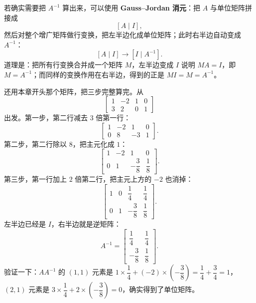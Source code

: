 \documentclass[UTF8,a4paper,12pt]{ctexart}
\numberwithin{equation}{section}
\begin{document}
	若确实需要把 $A^{-1}$ 算出来，可以使用 \textbf{Gauss--Jordan 消元}：把 $A$ 与单位矩阵拼接成
	\begin{equation}\label{eq:4.39}
	[A\mid I],
	\end{equation}
	然后对整个增广矩阵做行变换，把左半边化成单位矩阵；此时右半边自动变成 $A^{-1}$：
	\begin{equation}\label{eq:4.40}
	[A\mid I]
	\longrightarrow
	[I\mid A^{-1}].
	\end{equation}
	道理是：把所有行变换合并成一个矩阵 $M$，左半边变成 $I$ 说明 $MA=I$，即 $M=A^{-1}$；而同样的变换作用在右半边，得到的正是 $MI=M=A^{-1}$。
	
	还用本章开头那个矩阵，把三步完整算完。从
	\begin{equation}\label{eq:4.41}
	\left[
	\begin{array}{cc|cc}
		1&-2&1&0\\
		3&2&0&1
	\end{array}
	\right]
	\end{equation}
	出发。第一步，第二行减去 $3$ 倍第一行：
	\begin{equation}\label{eq:4.42}
	\left[
	\begin{array}{cc|cc}
		1&-2&1&0\\
		0&8&-3&1
	\end{array}
	\right].
	\end{equation}
	第二步，第二行除以 $8$，把主元化成 $1$：
	\begin{equation}\label{eq:4.43}
	\left[
	\begin{array}{cc|cc}
		1&-2&1&0\\[2pt]
		0&1&-\dfrac{3}{8}&\dfrac{1}{8}
	\end{array}
	\right].
	\end{equation}
	第三步，第一行加上 $2$ 倍第二行，把主元上方的 $-2$ 也消掉：
	\begin{equation}\label{eq:4.44}
	\left[
	\begin{array}{cc|cc}
		1&0&\dfrac{1}{4}&\dfrac{1}{4}\\[4pt]
		0&1&-\dfrac{3}{8}&\dfrac{1}{8}
	\end{array}
	\right].
	\end{equation}
	左半边已经是 $I$，右半边就是逆矩阵：
	\begin{equation}\label{eq:4.45}
	A^{-1}=
	\begin{bmatrix}
		\dfrac{1}{4}&\dfrac{1}{4}\\[4pt]
		-\dfrac{3}{8}&\dfrac{1}{8}
	\end{bmatrix}.
	\end{equation}
	验证一下：$AA^{-1}$ 的 $(1,1)$ 元素是 $1\times\dfrac{1}{4}+(-2)\times\left(-\dfrac{3}{8}\right)=\dfrac{1}{4}+\dfrac{3}{4}=1$，$(2,1)$ 元素是 $3\times\dfrac{1}{4}+2\times\left(-\dfrac{3}{8}\right)=0$，确实得到了单位矩阵。
	
\end{document}
